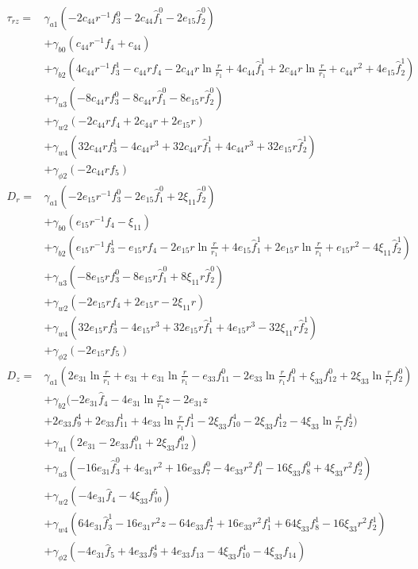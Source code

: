 \documentclass[12pt,sort&compress,fleqn,3p]{elsarticle}
\begin{document}
\begin{equation}
\begin{split}\label{labeq_stresses_02}
\tau_{rz} =  &\gamma_{a1} ( -2c_{44} r^{-1}f^0_3  - 2c_{44}\hat{f}^0_1 - 2e_{15}\hat{f}^0_2       )\\
&  + \gamma_{b0} ( c_{44}r^{-1}f_4    +  c_{44}    )  \\
& + \gamma_{b2} ( 4c_{44}r^{-1}f^1_3- c_{44}rf_4 -2c_{44}r\ln\frac{r}{r_1}  +   4 c_{44} \hat{f}^1_1  +   2c_{44}r\ln\frac{r}{r_1}  +   c_{44}r^2  +  4e_{15}\hat{f}^1_2 )\\
&+ \gamma_{u3}( -8c_{44}rf^0_3  - 8c_{44} r \hat{f}^0_1 - 8e_{15}r\hat{f}^0_2 )\\
&+ \gamma_{w2}( -2c_{44}rf_4  +  2c_{44}r + 2e_{15}r  ) \\
& + \gamma_{w4}( 32c_{44}rf^1_3 -4c_{44}r^3 +   32c_{44}r\hat{f}^1_1 + 4c_{44}r^3  + 32e_{15}r\hat{f}^1_2     )\\
&+  \gamma_{\phi2} ( -2c_{44}rf_5   )    \\
D_{r} =  &\gamma_{a1} ( -2e_{15} r^{-1}f^0_3  - 2e_{15}\hat{f}^0_1 + 2\xi_{11}\hat{f}^0_2       )\\
&  + \gamma_{b0} ( e_{15}r^{-1}f_4    - \xi_{11}   )  \\
& + \gamma_{b2} ( e_{15}r^{-1}f^1_3- e_{15}rf_4 -2e_{15}r\ln\frac{r}{r_1}  +   4 e_{15} \hat{f}^1_1  +   2e_{15}r\ln\frac{r}{r_1}  +   e_{15}r^2- 4\xi_{11}\hat{f}^1_2 )\\
&+ \gamma_{u3}( -8e_{15}rf^0_3  - 8e_{15} r \hat{f}^0_1 + 8\xi_{11}r\hat{f}^0_2 )\\
&+ \gamma_{w2}( -2e_{15}rf_4  +  2e_{15}r - 2\xi_{11}r  ) \\
& + \gamma_{w4}( 32e_{15}rf^1_3 -4e_{15}r^3 +   32e_{15}r\hat{f}^1_1 + 4e_{15}r^3  - 32\xi_{11}r\hat{f}^1_2     )\\
&+  \gamma_{\phi2} ( -2e_{15}rf_5   )    \\
D_{z} = &   \gamma_{a1} (   2e_{31}\ln\frac{r}{r_1} + e_{31}  + e_{31}\ln\frac{r}{r_1}    -e_{33}f^0_{11} -2e_{33}\ln\frac{r}{r_1} f^0_1  + \xi_{33}f^0_{12}  + 2\xi_{33}\ln\frac{r}{r_1}f^0_2  )\\
& + \gamma_{b2} ( - 2e_{31}\hat{f}_4 -4e_{31}\ln\frac{r}{r_1}z -2e_{31}z \\
& +2 e_{33} f^4_9 + 2 e_{33} f^1_{11} + 4   e_{33}  \ln\frac{r}{r_1} f^1_1 - 2 \xi_{33}f^4_{10} - 2\xi_{33}f^1_{12} -
 4\xi_{33}\ln\frac{r}{r_1}f^1_2   )\\
& + \gamma_{u1}( 2e_{31} - 2e_{33}f^0_{11}  + 2\xi_{33}f^0_{12} )\\
&+ \gamma_{u3}( -16e_{31}\hat{f}^0_3+  4e_{31}r^2  + 16 e_{33}f^0_7 - 4e_{33}r^2f^0_1  - 16\xi_{33}f^0_{8} + 4\xi_{33}r^2f^0_2 )\\
&+ \gamma_{w2}( -4e_{31}\hat{f}_4 - 4\xi_{33}f^5_{10} ) \\
& + \gamma_{w4}(  64e_{31}\hat{f}^1_3  -16e_{31}r^2z   -64e_{33}f^1_7 + 16e_{33}r^2f^1_1 + 64\xi_{33}f^1_{8} - 16\xi_{33}r^2f^1_2)\\
&+  \gamma_{\phi2} (  -4e_{31}\hat{f}_5  +   4e_{33}f^4_{9}+ 4e_{33}f_{13}- 4\xi_{33}f^4_{10} -4\xi_{33}f_{14} )    \\
\end{split}
\end{equation}
\end{document}
